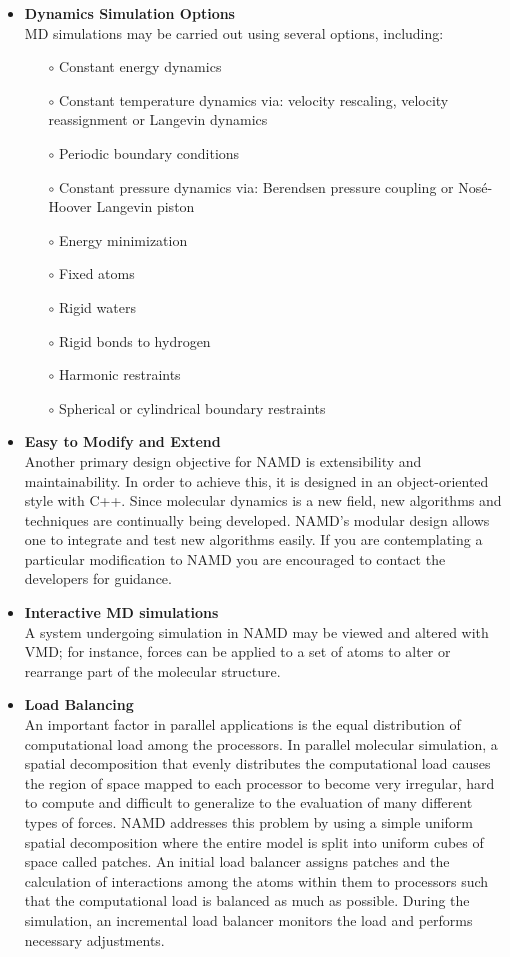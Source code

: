 \begin{itemize}
\item \textbf{Dynamics Simulation Options}\\
MD simulations may be carried out using several options, including:
\begin{itemize}
\item[$\circ$] Constant energy dynamics
\item[$\circ$] Constant temperature dynamics via: velocity rescaling, velocity reassignment or Langevin dynamics
\item[$\circ$] Periodic boundary conditions
\item[$\circ$] Constant pressure dynamics via: Berendsen pressure coupling or Nos\'{e}-Hoover Langevin piston
\item[$\circ$] Energy minimization
\item[$\circ$] Fixed atoms
\item[$\circ$] Rigid waters
\item[$\circ$] Rigid bonds to hydrogen
\item[$\circ$] Harmonic restraints
\item[$\circ$] Spherical or cylindrical boundary restraints
\end{itemize}
\item \textbf{Easy to Modify and Extend}\\
Another primary design objective for NAMD is extensibility and maintainability. In order to achieve this, it is designed in an object-oriented style with C++. Since molecular dynamics is a new field, new algorithms and techniques are continually being developed. NAMD’s modular design allows one to integrate and test new algorithms easily. If you are contemplating a particular modification to NAMD you are encouraged to contact the developers for guidance.
\item \textbf{Interactive MD simulations}\\
A system undergoing simulation in NAMD may be viewed and altered with VMD; for instance, forces can be applied to a set of atoms to alter or rearrange part of the molecular structure. 
\item \textbf{Load Balancing}\\
An important factor in parallel applications is the equal distribution of computational load among the processors. In parallel molecular simulation, a spatial decomposition that evenly distributes the computational load causes the region of space mapped to each processor to become very irregular, hard to compute and difficult to generalize to the evaluation of many different types of forces. NAMD addresses this problem by using a simple uniform spatial decomposition where the entire model is split into uniform cubes of space called patches. An initial load balancer assigns patches and the calculation of interactions among the atoms within them to processors such that the computational load is balanced as much as possible. During the simulation, an incremental load balancer monitors the load and performs necessary adjustments.
\end{itemize}

